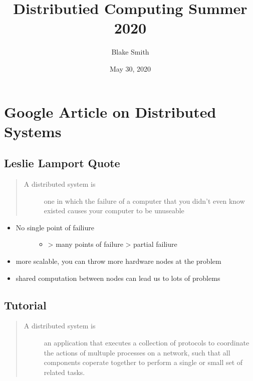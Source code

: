 \documentclass[letterpaper,10pt,english]{sphinxmanual}
\title{Distributied Computing Summer 2020}
\date{May 30, 2020}
\author{Blake Smith}
\begin{document}
\pagestyle{empty}
\sphinxmaketitle
\pagestyle{plain}
\sphinxtableofcontents
\pagestyle{normal}
\label{\detokenize{index::doc}}



\chapter{Google Article on Distributed Systems}
\label{\detokenize{google_article:google-article-on-distributed-systems}}\label{\detokenize{google_article::doc}}

\section{Leslie Lamport Quote}
\label{\detokenize{google_article:leslie-lamport-quote}}\begin{quote}\begin{description}
\item[{A distributed system is}] \leavevmode
one in which the failure of a computer that
you didn’t even know existed causes your computer to be unuseable

\end{description}\end{quote}
\begin{itemize}
\item {} \begin{description}
\item[{No single point of failiure}] \leavevmode\begin{itemize}
\item {} 
\sphinxhyphen{}\textgreater{} many points of failure \sphinxhyphen{}\textgreater{} partial failiure

\end{itemize}

\end{description}

\item {} 
more scalable, you can throw more hardware nodes at the problem

\item {} 
shared computation between nodes can lead us to lots of problems

\end{itemize}


\section{Tutorial}
\label{\detokenize{google_article:tutorial}}\begin{quote}\begin{description}
\item[{A distributed system is}] \leavevmode
an application that executes a collection
of protocols to co\sphinxhyphen{}ordinate the actions
of multuple processes on a network, such that
all components coperate together to perform a
single or small set of related tasks.

\end{description}\end{quote}
\end{document}
